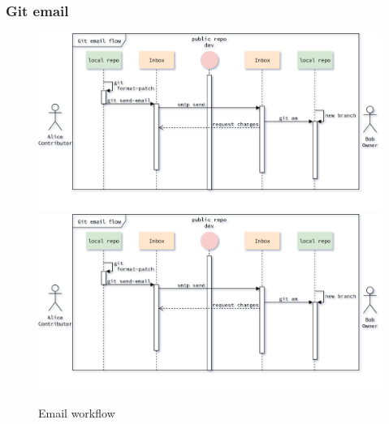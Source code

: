\begin{frame}
    \frametitle{Git email}
    \begin{figure}
        \begin{center}
            {
                \includegraphics[height=0.7\textheight,keepaspectratio]{./images/EmailWorkflow_RequestChanges.png}
            }
            {
                \includegraphics[height=0.75\textheight,keepaspectratio]{./images/EmailWorkflow_RequestChanges.png}
            }
            \caption{Email workflow}
        \end{center}
    \end{figure}
\end{frame}

